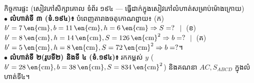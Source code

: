 \documentclass[a4paper,10pt]{article}
\newcommand{\unit}[1]{\,\text{\en{#1}}}
\begin{document}
\vspace{3.5pt}
\begin{tcolorbox}[
  enhanced, sharp corners, colback=panelgray, colframe=black,
  boxrule=1.0pt, boxsep=2pt, top=3pt, bottom=3pt, left=6pt, right=6pt
]
  {\muol\fontsize{9.0pt}{13pt}\selectfont កិច្ចការផ្ទះ (សៀវភៅសិក្សាគោល ទំព័រ ១៩៤ — ធ្វើដាក់ក្នុងសៀវភៅលំហាត់សម្រាប់ម៉ោងក្រោយ)}\\[2pt]
  $\bullet$ \textbf{លំហាត់ទី ៣ (ទំ.១៩៤)៖} បំពេញតារាងចតុកោណព្នាយ៖ (ក) $b'=7\unit{cm}, b=11\unit{cm}, h=6\unit{cm} \Rightarrow S=?$ $\;\vert\;$ (ខ) $b'=8\unit{cm}, h=14\unit{cm}, S=126\unit{cm}^2 \Rightarrow b=?$ $\;\vert\;$ (គ) $b'=5\unit{cm}, h=8\unit{cm}, S=72\unit{cm}^2 \Rightarrow b=?$។\\
  $\bullet$ \textbf{លំហាត់ទី ២(រូបទី២) និងទី ៤ (ទំ.១៩៤)៖} រកកម្ពស់ $y$ ($b'=28\unit{cm}, b=38\unit{cm}, S=834\unit{cm}^2$) និងគណនា $AC, S_{ABCD}$ ក្នុងលំហាត់ទី៤។
\end{tcolorbox}
\end{document}

